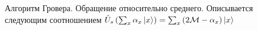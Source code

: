 \begin{figure}
\centering



\caption{Алгоритм Гровера. Обращение относительно
  среднего. Описывается следующим соотношением 
$\hat{U}_s\left(\sum_x \alpha_x \ket{x}\right) = 
\sum_x \left(2 \mathcal{M} - \alpha_x \right)\ket{x}$}
\label{figQuantCompGroverInvMiddle}
\end{figure}
